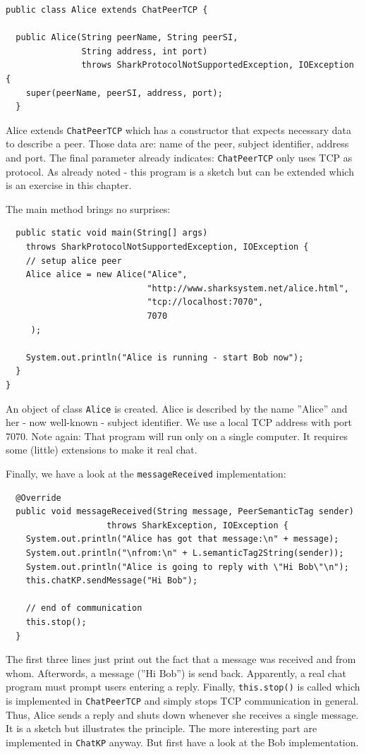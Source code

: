 {\begin{verbatim}
public class Alice extends ChatPeerTCP {

  public Alice(String peerName, String peerSI,
               String address, int port)
               throws SharkProtocolNotSupportedException, IOException {
    super(peerName, peerSI, address, port);
  }
\end{verbatim}

Alice extends {\tt ChatPeerTCP} which has a constructor that expects necessary data to describe a peer. Those data are: name of the peer, subject identifier, address and port. The final parameter already indicates: {\tt ChatPeerTCP} only uses TCP as protocol. As already noted - this program is a sketch but can be extended which is an exercise in this chapter.

The main method brings no surprises:
\begin{verbatim}
  public static void main(String[] args)
    throws SharkProtocolNotSupportedException, IOException {
    // setup alice peer
    Alice alice = new Alice("Alice",
                            "http://www.sharksystem.net/alice.html",
                            "tcp://localhost:7070",
                            7070
     );

    System.out.println("Alice is running - start Bob now");
  }
}
\end{verbatim}

An object of class {\tt Alice} is created. Alice is described by the name ''Alice'' and her - now well-known - subject identifier. We use a local TCP address with port 7070. Note again: That program will run only on a single computer. It requires some (little) extensions to make it real chat.

Finally, we have a look at the {\tt messageReceived} implementation:
\begin{verbatim}
  @Override
  public void messageReceived(String message, PeerSemanticTag sender)
                    throws SharkException, IOException {
    System.out.println("Alice has got that message:\n" + message);
    System.out.println("\nfrom:\n" + L.semanticTag2String(sender));
    System.out.println("Alice is going to reply with \"Hi Bob\"\n");
    this.chatKP.sendMessage("Hi Bob");

    // end of communication
    this.stop();
  }
\end{verbatim}

The first three lines just print out the fact that a message was
received and from whom. Afterwords, a message (''Hi Bob'') is send
back. Apparently, a real chat program must prompt users entering
a reply. Finally, {\tt this.stop()} is called which is implemented in
{\tt ChatPeerTCP} and simply stops TCP communication in general. Thus,
Alice sends a reply and shuts down whenever she receives a single message.
It is a sketch but illustrates the principle. The more interesting part are
implemented in {\tt ChatKP} anyway. But first have a look at the Bob implementation.

}
